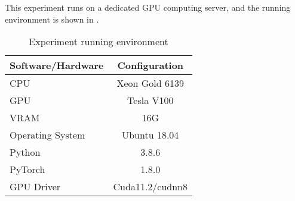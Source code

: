 This experiment runs on a dedicated GPU computing server, and the running environment is shown in \tblname{\ref{tbl:ch3-exp-env}}.
\begin{table}[htbp!]
    \caption{Experiment running environment}\label{tbl:ch3-exp-env}
    \centering
    \begin{tabular}{l c}
        \toprule
        Software/Hardware & Configuration   \\
        \midrule
        CPU               & Xeon Gold 6139  \\
        GPU               & Tesla V100      \\
        VRAM              & 16G             \\
        Operating System  & Ubuntu 18.04    \\
        Python            & 3.8.6           \\
        PyTorch           & 1.8.0           \\
        GPU Driver        & Cuda11.2/cudnn8 \\
        \bottomrule
    \end{tabular}
\end{table}


